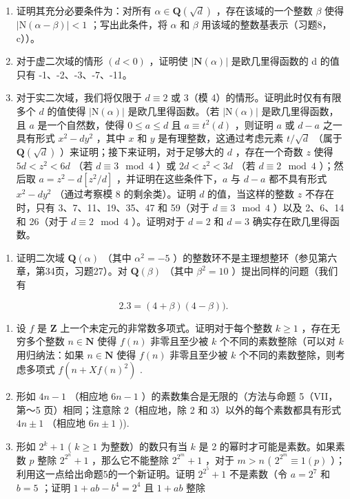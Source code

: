 \begin{enumerate}
\def\labelenumi{\alph{enumi})}
\item
  证明其充分必要条件为：对所有 \(\alpha \in \mathbf{Q}(\sqrt{d})\) ，存在该域的一个整数 \(\beta\) 使得 \(|\mathrm{N}(\alpha - \beta)| < 1\) ；写出此条件，将 \(\alpha\) 和 \(\beta\) 用该域的整数基表示（习题8，c））。
\item
  对于虚二次域的情形 \((d < 0)\) ，证明使 \(|\mathbf{N}(\alpha)|\) 是欧几里得函数的 d 的值只有 -1、-2、-3、-7、-11。
\item
  对于实二次域，我们将仅限于 \(d \equiv 2\) 或 3（模 4）的情形。证明此时仅有有限多个 \(d\) 的值使得 \(|\mathrm{N}(\alpha)|\) 是欧几里得函数。（若 \(|\mathrm{N}(\alpha)|\) 是欧几里得函数，且 \(a\) 是一个自然数，使得 \(0 \leqslant a \leqslant d\) 且 \(a \equiv t^2(d)\) ，则证明 \(a\) 或 \(d - a\) 之一具有形式 \(x^2 - dy^2\) ，其中 \(x\) 和 \(y\) 是有理整数，这通过考虑元素 \(t / \sqrt{d}\) （属于 \(\mathbf{Q}(\sqrt{d})\) ）来证明；接下来证明，对于足够大的 \(d\) ，存在一个奇数 \(z\) 使得 \(5d < z^2 < 6d\) （若 \(d \equiv 3 \mod 4\) ）或 \(2d < z^2 < 3d\) （若 \(d \equiv 2 \mod 4\) ）；然后取 \(a = z^2 - d[z^2/d]\) ，并证明在这些条件下，\(a\) 与 \(d - a\) 都不具有形式 \(x^2 - dy^2\) （通过考察模 8 的剩余类）。证明 \(d\) 的值，当这样的整数 \(z\) 不存在时，只有 3、7、11、19、35、47 和 59（对于 \(d \equiv 3 \mod 4\) ）以及 2、6、14 和 26（对于 \(d \equiv 2 \mod 4\) ）。证明对于 \(d = 2\) 和 \(d = 3\) 确实存在欧几里得函数。
\end{enumerate}

\begin{enumerate}
\def\labelenumi{\arabic{enumi})}
\setcounter{enumi}{11}
\tightlist
\item
  证明二次域 \(\mathbf{Q}(\alpha)\) （其中 \(\alpha^2 = -5\) ）的整数环不是主理想整环（参见第六章，第34页，习题27）。对 \(\mathbf{Q}(\beta)\) （其中 \(\beta^2 = 10\) ）提出同样的问题（我们有
\end{enumerate}

\[
2. 3 = (4 + \beta) (4 - \beta)).
\]

\begin{enumerate}
\def\labelenumi{\arabic{enumi})}
\setcounter{enumi}{12}
\item
  设 \(f\) 是 \(\mathbf{Z}\) 上一个未定元的非常数多项式。证明对于每个整数 \(k \geqslant 1\) ，存在无穷多个整数 \(n \in \mathbf{N}\) 使得 \(f(n)\) 非零且至少被 \(k\) 个不同的素数整除（可以对 \(k\) 用归纳法：如果 \(n \in \mathbf{N}\) 使得 \(f(n)\) 非零且至少被 \(k\) 个不同的素数整除，则考虑多项式 \(f(n + Xf(n)^2)\) .
\item
  形如 \(4n - 1\) （相应地 \(6n - 1\) ）的素数集合是无限的（方法与命题 5（VII，第～5 页）相同；注意除 2（相应地，除 2 和 3）以外的每个素数都具有形式 \(4n \pm 1\) （相应地 \(6n \pm 1\) )).
\item
  形如 \(2^k + 1\) ( \(k \geqslant 1\) 为整数）的数只有当 \(k\) 是 2 的幂时才可能是素数。如果素数 \(p\) 整除 \(2^{2^n} + 1\) ，那么它不能整除 \(2^{2^m} + 1\) ，对于 \(m > n\) ( \(2^{2^m} \equiv 1(p)\) ）；利用这一点给出命题5的一个新证明。证明 \(2^{2^5} + 1\) 不是素数（令 \(a = 2^7\) 和 \(b = 5\) ；证明 \(1 + ab - b^4 = 2^4\) 且 \(1 + ab\) 整除
\end{enumerate}

